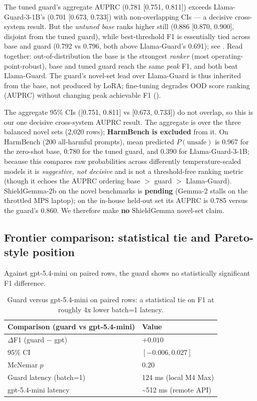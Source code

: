 \documentclass[sigconf,nonacm]{acmart}
\begin{document}
The tuned guard's aggregate AUPRC (0.781 [0.751, 0.811]) exceeds Llama-Guard-3-1B's (0.701 [0.673, 0.733]) with non-overlapping CIs --- a decisive cross-system result. But the \emph{untuned base} ranks higher still (0.886 [0.870, 0.900], disjoint from the tuned guard), while best-threshold F1 is essentially tied across base and guard (0.792 vs 0.796, both above Llama-Guard's 0.691); see . Read together: out-of-distribution the base is the strongest \emph{ranker} (most operating-point-robust), base and tuned guard reach the same \emph{peak} F1, and both beat Llama-Guard. The guard's novel-set lead over Llama-Guard is thus inherited from the base, not produced by LoRA; fine-tuning degrades OOD score ranking (AUPRC) without changing peak achievable F1 ().

The aggregate 95\% CIs ([0.751, 0.811] vs [0.673, 0.733]) do not overlap, so this is our one decisive cross-system AUPRC result. The aggregate is over the three balanced novel sets (2,020 rows); \textbf{HarmBench is excluded} from it. On HarmBench (200 all-harmful prompts), mean predicted $P(\text{unsafe})$ is 0.967 for the zero-shot base, 0.780 for the tuned guard, and 0.390 for Llama-Guard-3-1B; because this compares raw probabilities across differently temperature-scaled models it is \emph{suggestive, not decisive} and is not a threshold-free ranking metric (though it echoes the AUPRC ordering base $>$ guard $>$ Llama-Guard). ShieldGemma-2b on the novel benchmarks is \textbf{pending} (Gemma-2 stalls on the throttled MPS laptop); on the in-house held-out set its AUPRC is 0.785 versus the guard's 0.860. We therefore make \textbf{no} ShieldGemma novel-set claim.

\subsection{Frontier comparison: statistical tie and Pareto-style position}
\label{subsec:frontier}

Against gpt-5.4-mini on paired rows, the guard shows no statistically significant F1 difference.

\begin{table}[t]
\centering
\small
\caption{Guard versus gpt-5.4-mini on paired rows: a statistical tie on F1 at roughly 4x lower batch=1 latency.}
\label{tab:frontier}
\begin{tabular}{ll}
\toprule
Comparison (guard vs gpt-5.4-mini) & Value \\
\midrule
$\Delta$F1 (guard $-$ gpt) & $+0.010$ \\
95\% CI & $[-0.006, 0.027]$ \\
McNemar $p$ & 0.20 \\
Guard latency (batch=1) & 124 ms (local M4 Max) \\
gpt-5.4-mini latency & \textasciitilde{}512 ms (remote API) \\
\bottomrule
\end{tabular}
\end{table}
\end{document}
